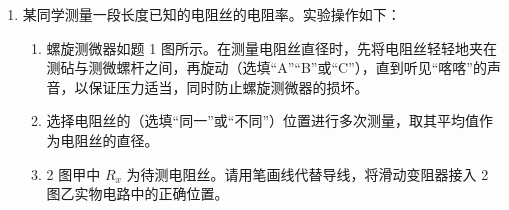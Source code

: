 \documentclass[\gkver]{gaokaozhenti}
\begin{document}
\begin{enumerate}
\begin{enumerate}
	\item
	测出小车的质量为 $M$，再测出纸带上起点到 A 点的距离为 $L$。小车动能的变化量可用 $\Delta E_{k} = \frac{1}{2}Mv_{A}^{2}$ 算出。砝码盘中砝码的质量为 $m$，重力加速度为 $g$；实验中，小车的质量应\tkanswer{}（选填“远大于”“远小于”或“接近”）砝码、砝码盘和沙子的总质量，小车所受合力做的功可用 $W = mgL$ 算出。多次测量，若 $W$ 与 $\Delta E_{k}$ 均基本相等则验证了动能定理。
\end{enumerate}

\item
某同学测量一段长度已知的电阻丝的电阻率。实验操作如下：
\begin{enumerate}
	\item
	螺旋测微器如题 1 图所示。在测量电阻丝直径时，先将电阻丝轻轻地夹在测砧与测微螺杆之间，再旋动\tkanswer{}（选填“A”“B”或“C”），直到听见“喀喀”的声音，以保证压力适当，同时防止螺旋测微器的损坏。
	
	\item
	选择电阻丝的\tkanswer{}（选填“同一”或“不同”）位置进行多次测量，取其平均值作为电阻丝的直径。
	\item
	2 图甲中 $R_{x}$ 为待测电阻丝。请用笔画线代替导线，将滑动变阻器接入 2 图乙实物电路中的正确位置\tkanswer{}。
	

\end{enumerate}
\end{enumerate}
\end{document}
